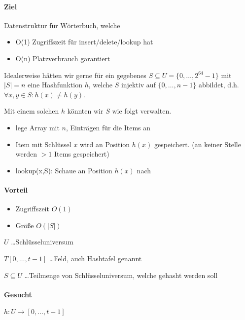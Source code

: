 \paragraph*{Ziel} Datenstruktur für Wörterbuch, welche
\begin{itemize}
	\item O(1) Zugriffszeit für insert/delete/lookup hat
	\item O(n) Platzverbrauch garantiert
\end{itemize}

\par\medskip
Idealerweise hätten wir gerne für ein gegebenes $S \subseteq U = \{ 0,\dots,2^{64}-1 \}$ mit $|S|=n$ eine Hashfunktion $h$, welche $S$ injektiv auf $\{ 0,\dots,n-1 \}$ abbildet, d.h. $\forall x,y \in S: h(x) \not= h(y)$.\par\medskip


\par\medskip
Mit einem solchen $h$ könnten wir $S$ wie folgt verwalten.\par\medskip
\begin{itemize}
	\item lege Array mit $n$, Einträgen für die Items an
	\item Item mit Schlüssel $x$ wird an Position $h(x)$ gespeichert. (an keiner Stelle werden $>1$ Items gespeichert)
	\item lookup(x,S): Schaue an Position $h(x)$ nach
\end{itemize}

\paragraph*{Vorteil}
\begin{itemize}
	\item Zugriffszeit $O(1)$
	\item Größe $O(|S|)$
\end{itemize}

\par\medskip
$U$ \dots Schlüsseluniversum\par\medskip

$T[0,\dots,t-1]$ \dots Feld, auch Hashtafel genannt\par\medskip

$S \subseteq U$ \dots Teilmenge von Schlüsseluniversum, welche gehasht werden soll\par\medskip

\paragraph*{Gesucht} $h:U \rightarrow [0,\dots,t-1]$

